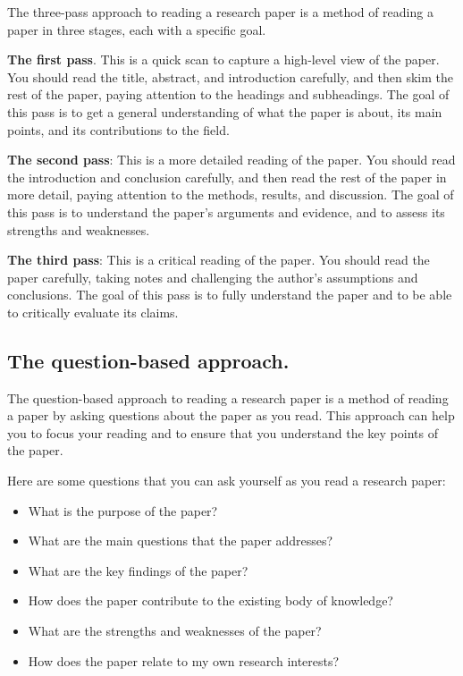 \documentclass[
]{book}
\begin{document}
The three-pass approach to reading a research paper is a method of reading a paper in three stages, each with a specific goal.

\textbf{The first pass}. This is a quick scan to capture a high-level view of the paper. You should read the title, abstract, and introduction carefully, and then skim the rest of the paper, paying attention to the headings and subheadings. The goal of this pass is to get a general understanding of what the paper is about, its main points, and its contributions to the field.

\textbf{The second pass}: This is a more detailed reading of the paper. You should read the introduction and conclusion carefully, and then read the rest of the paper in more detail, paying attention to the methods, results, and discussion. The goal of this pass is to understand the paper's arguments and evidence, and to assess its strengths and weaknesses.

\textbf{The third pass}: This is a critical reading of the paper. You should read the paper carefully, taking notes and challenging the author's assumptions and conclusions. The goal of this pass is to fully understand the paper and to be able to critically evaluate its claims.

\subsection*{The question-based approach.}\label{the-question-based-approach.}

The question-based approach to reading a research paper is a method of reading a paper by asking questions about the paper as you read. This approach can help you to focus your reading and to ensure that you understand the key points of the paper.

Here are some questions that you can ask yourself as you read a research paper:

\begin{itemize}
\item
  What is the purpose of the paper?
\item
  What are the main questions that the paper addresses?
\item
  What are the key findings of the paper?
\item
  How does the paper contribute to the existing body of knowledge?
\item
  What are the strengths and weaknesses of the paper?
\item
  How does the paper relate to my own research interests?
\end{itemize}
\end{document}
